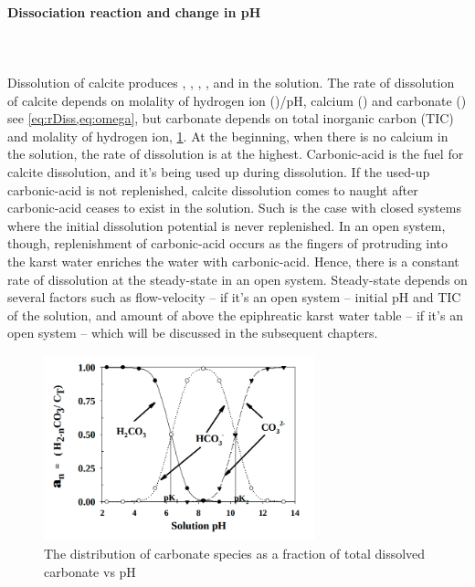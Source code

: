 \paragraph*{Dissociation reaction and change in pH}\mbox{}\\ \\
Dissolution of calcite produces , , , , and  in the solution. 
The rate of dissolution of calcite depends on molality of hydrogen ion ()/pH, calcium () and 
carbonate () see \cref{eq:rDiss,eq:omega}, but carbonate depends on total inorganic carbon (TIC) and 
molality of hydrogen ion, \cref{fig:dissKinetics}. At the beginning, when there is no calcium in the solution, the rate of dissolution is at the highest. 
Carbonic-acid is the fuel for calcite dissolution, and it's being used up during dissolution. 
If the used-up carbonic-acid is not replenished, calcite dissolution comes to naught after carbonic-acid ceases to exist in the solution. 
Such is the case with closed systems where the initial dissolution potential is never replenished. In an open system, though, replenishment of 
carbonic-acid occurs as the fingers of  protruding into the karst water enriches the water with carbonic-acid. Hence, there is a constant 
rate of dissolution at the steady-state in an open system. Steady-state depends on several factors such as flow-velocity -- if it's an open 
system -- initial pH and TIC of the solution, and amount of  above the epiphreatic karst water table -- if it's an open system -- which will be 
discussed in  the subsequent chapters. \\

\begin{figure}
\centering
\includegraphics[width=0.7\textwidth]{PICTURES/dissolutionKinetics.png}
\caption{The distribution of carbonate species as a fraction of total dissolved carbonate vs pH \cite{butler1991carbon}}
\label{fig:dissKinetics}
\end{figure}

